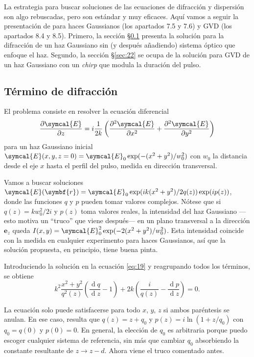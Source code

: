 \documentclass{scrartcl} %
\newcommand*{\dv}[2]{\frac{\operatorname{d}\!#1}{\operatorname{d}\!#2}}
\newcommand*{\pdv}[2]{\frac{\partial#1}{\partial#2}}
\newcommand*{\pdvN}[3]{\frac{\partial^{#3}#1}{\partial{#2}^{#3}}}
\begin{document}
La estrategia para buscar soluciones de las ecuaciones de difracción y dispersión son algo rebuscadas, pero son estándar y muy eficaces. Aquí vamos a seguir la presentación de \cite{Milonni2010} para haces Gaussianos (los apartados 7.5 y 7.6) y GVD (los apartados 8.4 y 8.5). Primero, la sección \S\ref{sec:21} presenta la solución para la difracción de un haz Gaussiano sin (y después añadiendo) sistema óptico que enfoque el haz. Segundo, la sección \S\ref{sec:22} se ocupa de la solución para GVD de un haz Gaussiano con un \emph{chirp} que modula la duración del pulso.

\subsection{Término de difracción}\label{sec:21}
El problema consiste en resolver la ecuación diferencial
\begin{equation}\label{eq:19}
  \pdv{\symcal{E}}{z} = i \frac{1}{2k} \left(\pdvN{\symcal{E}}{x}{2} + \pdvN{\symcal{E}}{y}{2}\right)
\end{equation}
para un haz Gaussiano inicial $\symcal{E}(x,y,z=0) = \symcal{E}_{0} \exp(-(x^{2}+y^{2})/w^{2}_{0})$ con $w_{0}$ la distancia desde el eje $x$ hasta el perfil del pulso, medida en dirección transversal.

Vamos a buscar soluciones $\symcal{E}(\symbf{r}) = \symcal{E}_{0}\exp(ik(x^{2}+y^{2})/2q(z))\exp(ip(z))$, donde las funciones $q$ y $p$ pueden tomar valores complejos. Nótese que si $q(z) = kw^{2}_{0}/2i$ y $p(z)$ toma valores reales, la intensidad del haz Gaussiano ---esto motiva un \enquote{truco} que viene después--- en un plano transversal a la dirección $\symbf{e}_{z}$ queda $I(x,y) = \symcal{E}^{2}_{0}\exp(-2(x^{2}+y^{2})/w^{2}_{0})$. Esta intensidad coincide con la medida en cualquier experimento para haces Gaussianos, así que la solución propuesta, en principio, tiene buena pinta.

Introduciendo la solución en la ecuación \eqref{eq:19} y reagrupando todos los términos, se obtiene
\begin{equation}\label{eq:22}
  k^{2}\frac{x^{2}+y^{2}}{q^{2}(z)}\left(\dv{q}{z} - 1\right) + 2k \left(\frac{i}{q(z)}-\dv{p}{z}\right) = 0.
\end{equation}

La ecuación solo puede satisfacerse para todo $x$, $y$, $z$ si ambos paréntesis se anulan. En ese caso, resulta que $q(z) = z + q_{0}$ y $p(z) = i\ln(1+z/q_{0})$ con $q_{0} = q(0)$ y $p(0) = 0$. En general, la elección de $q_{0}$ es arbitraria porque puedo escoger cualquier sistema de referencia, sin más que cambiar $q_{0}$ absorbiendo la constante resultante de $z \rightarrow z - d$. Ahora viene el truco comentado antes. 
\end{document}

